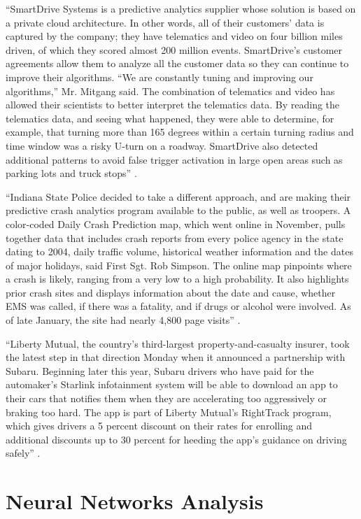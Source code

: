 ``SmartDrive Systems is a predictive analytics supplier whose solution is based on a private cloud architecture.  In other words, all of their customers’ data is captured by the company; they have telematics and video on four billion miles driven, of which they scored almost 200 million events.   SmartDrive’s customer agreements allow them to analyze all the customer data so they can continue to improve their algorithms.  “We are constantly tuning and improving our algorithms,” Mr. Mitgang said. The combination of telematics and video has allowed their scientists to better interpret the telematics data. By reading the telematics data, and seeing what happened, they were able to determine, for example, that turning more than 165 degrees within a certain turning radius and time window was a risky U-turn on a roadway. SmartDrive also detected additional patterns to avoid false trigger activation in large open areas such as parking lots and truck stops'' \cite{Banker2016accident}.

``Indiana State Police decided to take a different approach, and are making their predictive crash analytics program available to the public, as well as troopers. A color-coded Daily Crash Prediction map, which went online in November, pulls together data that includes crash reports from every police agency in the state dating to 2004, daily traffic volume, historical weather information and the dates of major holidays, said First Sgt. Rob Simpson. The online map pinpoints where a crash is likely, ranging from a very low to a high probability. It also highlights prior crash sites and displays information about the date and cause, whether EMS was called, if there was a fatality, and if drugs or alcohol were involved. As of late January, the site had nearly 4,800 page visits'' \cite{Bergal2017sites}.

``Liberty Mutual, the country's third-largest property-and-casualty insurer, took the latest step in that direction Monday when it announced a partnership with Subaru. Beginning later this year, Subaru drivers who have paid for the automaker's Starlink infotainment system will be able to download an app to their cars that notifies them when they are accelerating too aggressively or braking too hard. The app is part of Liberty Mutual's RightTrack program, which gives drivers a 5 percent discount on their rates for enrolling and additional discounts up to 30 percent for heeding the app's guidance on driving safely'' \cite{Fung2016turn}. 

\section{Neural Networks Analysis}


